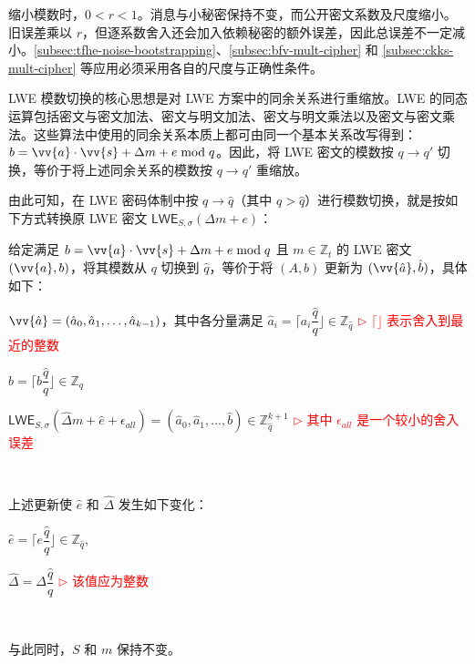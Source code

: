 缩小模数时，$0<r<1$。消息与小秘密保持不变，而公开密文系数及尺度缩小。旧误差乘以 $r$，但逐系数舍入还会加入依赖秘密的额外误差，因此总误差不一定减小。\autoref{subsec:tfhe-noise-bootstrapping}、\autoref{subsec:bfv-mult-cipher} 和 \autoref{subsec:ckks-mult-cipher} 等应用必须采用各自的尺度与正确性条件。

LWE 模数切换的核心思想是对 LWE 方案中的同余关系进行重缩放。LWE 的同态运算包括密文与密文加法、密文与明文加法、密文与明文乘法以及密文与密文乘法。这些算法中使用的同余关系本质上都可由同一个基本关系改写得到：$b = \vv{a}\cdot \vv{s} + \Delta m + e \bmod q$。因此，将 LWE 密文的模数按 $q \rightarrow q'$ 切换，等价于将上述同余关系的模数按 $q \rightarrow q'$ 重缩放。

由此可知，在 LWE 密码体制中按 $q \rightarrow \hat{q}$（其中 $q > \hat{q}$）进行模数切换，就是按如下方式转换原 LWE 密文 $\textsf{LWE}_{S, \sigma}(\Delta m + e)$：

\begin{tcolorbox}[title={\textbf{\tboxlabel{\ref*{subsec:modulus-switch-lwe}} LWE 模数切换}}]

给定满足 $b = \vv{a}\cdot \vv{s} + \Delta m + e \bmod q$ 且 $m \in \mathbb{Z}_t$ 的 LWE 密文 $(\vv{a}, b)$，将其模数从 $q$ 切换到 $\hat q$，等价于将 $(A, b)$ 更新为 $(\vv{\hat{a}}, \hat b)$，具体如下：


$\vv{\hat{a}} = (\hat{a}_0, \hat{a}_1, \ldots, \hat{a}_{k-1})$，其中各分量满足 $\hat{a}_i = \Big\lceil a_i\dfrac{\hat{q}}{q} \Big\rfloor \in \mathbb{Z}_{\hat{q}}$ \textcolor{red}{ $\rhd$ $\lceil \rfloor$ 表示舍入到最近的整数}

 $\hat{b} = \Big\lceil b \dfrac{\hat{q}}{q} \Big\rfloor \in \mathbb{Z}_{\hat{q}}$

$\textsf{LWE}_{{S},\sigma}(\hat{\Delta}  m + \hat{e} + \epsilon_{\textit{all}}) = (\hat{a}_0, \hat{a}_1, \ldots, \hat{b}) \in \mathbb{Z}_{\hat{q}}^{k + 1}$ \textcolor{red}{ $\rhd$ 其中 $\epsilon_{\textit{all}}$ 是一个较小的舍入误差}

$ $


上述更新使 $\hat e$ 和 $\hat \Delta$ 发生如下变化：

$\hat{e} = \Big\lceil e\dfrac{\hat{q}}{q} \Big\rfloor \in \mathbb{Z}_{\hat{q}}$, \text{ }

$\hat{\Delta} = \Delta\dfrac{\hat{q}}{q}$ \textcolor{red}{ $\rhd$ 该值应为整数}

$ $


与此同时，$S$ 和 $m$ 保持不变。

\end{tcolorbox}

